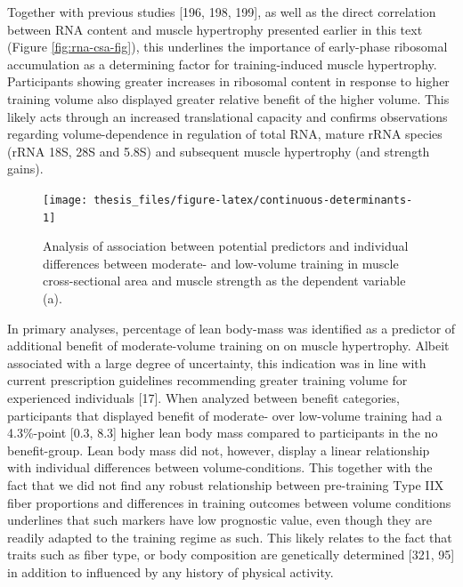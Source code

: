 \documentclass[twoside,10pt]{gihclass} %
\begin{document}
Together with previous studies
{[}196, 198, 199{]},
as well as the direct correlation between RNA content and muscle hypertrophy presented earlier in this text
(Figure \ref{fig:rna-csa-fig}),
this underlines the importance of early-phase ribosomal accumulation as a determining factor for training-induced muscle hypertrophy.
Participants showing greater increases in ribosomal content in response to higher training volume also displayed greater relative benefit of the higher volume.
This likely acts through an increased translational capacity and confirms observations regarding volume-dependence in regulation of total RNA, mature rRNA species (rRNA 18S, 28S and 5.8S) and subsequent muscle hypertrophy (and strength gains).
\begin{figure}

{\centering \texttt{[image: thesis\_files/figure-latex/continuous-determinants-1]} 

}

\caption[Predictors of differences in outcomes between moderate- and low-volume training. Values in (a) are standardized regression coefficients with 95\% CI from univariate robust regression. Positive estimates indicate a positive association. Variables related to blood parameters, body composition and muscle strength was mean centered per sex.]{Analysis of association between potential predictors and individual differences between moderate- and low-volume training in muscle cross-sectional area and muscle strength as the dependent variable (a).}\label{fig:continuous-determinants}
\end{figure}
In primary analyses, percentage of lean body-mass was identified as a predictor of additional benefit of moderate-volume training on on muscle hypertrophy.
Albeit associated with a large degree of uncertainty, this indication was in line with current prescription guidelines recommending greater training volume for experienced individuals
{[}17{]}.
When analyzed between benefit categories, participants that displayed benefit of moderate- over low-volume training had a 4.3\%-point {[}0.3, 8.3{]} higher lean body mass compared to participants in the no benefit-group.
Lean body mass did not, however, display a linear relationship with individual differences between volume-conditions.
This together with the fact that we did not find any robust relationship between pre-training Type IIX fiber proportions and differences in training outcomes between volume conditions underlines that such markers have low prognostic value, even though they are readily adapted to the training regime as such.
This likely relates to the fact that traits such as fiber type, or body composition are genetically determined
{[}321, 95{]}
in addition to influenced by any history of physical activity.
\end{document}
